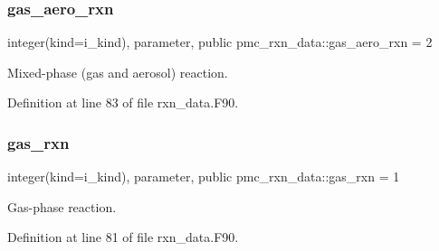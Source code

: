 \mbox{\label{namespacepmc__rxn__data_aa70ce267bb3565e338327b106143ba5f}} 
\subsubsection{\texorpdfstring{gas\+\_\+aero\+\_\+rxn}{gas\_aero\_rxn}}
{\footnotesize\ttfamily integer(kind=i\+\_\+kind), parameter, public pmc\+\_\+rxn\+\_\+data\+::gas\+\_\+aero\+\_\+rxn = 2}



Mixed-\/phase (gas and aerosol) reaction. 



Definition at line 83 of file rxn\+\_\+data.\+F90.

\mbox{\label{namespacepmc__rxn__data_a111b121911199623f10770744af6488f}} 
\subsubsection{\texorpdfstring{gas\+\_\+rxn}{gas\_rxn}}
{\footnotesize\ttfamily integer(kind=i\+\_\+kind), parameter, public pmc\+\_\+rxn\+\_\+data\+::gas\+\_\+rxn = 1}



Gas-\/phase reaction. 



Definition at line 81 of file rxn\+\_\+data.\+F90.

